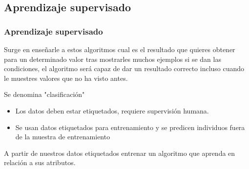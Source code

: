 \documentclass[
	11pt, %
]{beamer}
\begin{document}
\subsection{Aprendizaje supervisado}
\begin{frame}
  \frametitle{Aprendizaje supervisado}

  Surge en enseñarle a estos algoritmos cual es el resultado que quieres obtener para un determinado valor tras mostrarles muchos ejemplos si se dan las condiciones, el algoritmo será capaz de dar un resultado correcto incluso cuando le muestres valores que no ha visto antes.

  \smallskip %

  Se denomina "clasificación"

  \begin{itemize}
    \item Los datos deben estar etiquetados, requiere supervisión humana.
    \item Se usan datos etiquetados para entrenamiento y se predicen individuos fuera de la muestra de entrenamiento
  \end{itemize}
  
  \smallskip %

  A partir de nuestros datos etiquetados entrenar un algoritmo que aprenda en relación a sus atributos.
    
\end{frame}

\end{document}
